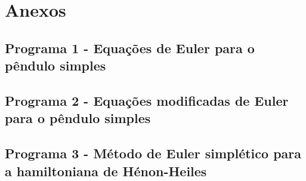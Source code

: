 \documentclass[a4paper,10pt]{article}
\begin{document}
\section*{Anexos}

\subsection*{Programa 1 - Equações de Euler para o pêndulo simples}
\lstset{inputencoding=utf8/latin1}


\subsection*{Programa 2 - Equações modificadas de Euler para o pêndulo simples}
\lstset{inputencoding=utf8/latin1}


\subsection*{Programa 3 - Método de Euler simplético para a hamiltoniana de Hénon-Heiles}
\lstset{inputencoding=utf8/latin1}

\end{document}
